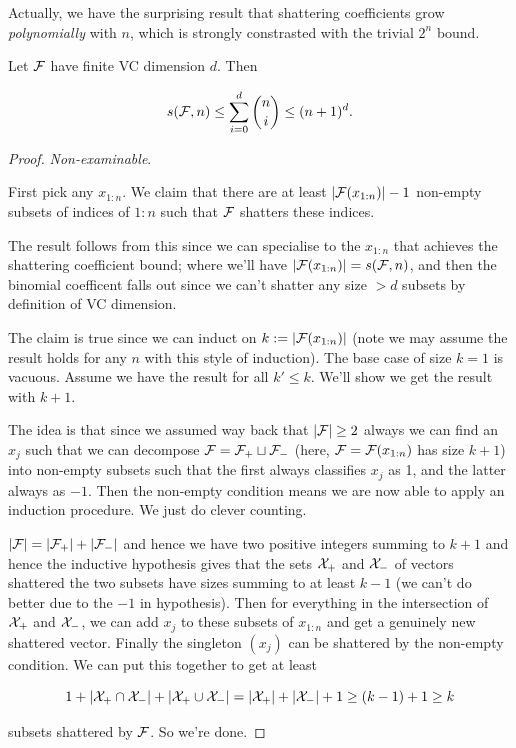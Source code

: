 \documentclass[11pt]{scrartcl}
\begin{document}
Actually, we have the surprising result that shattering coefficients grow \emph{polynomially} with $n$, which is strongly constrasted with the trivial $2^n$ bound.

\begin{theorem}

Let $\mathcal{F}$ have finite VC dimension $d$. Then

\begin{equation}
    s(\mathcal{F}, n) \le \sum_{i=0}^d \binom{n}{i} \le (n+1)^d.
\end{equation}

\begin{proof}
\emph{Non-examinable}.

First pick any $x_{1:n}$. We claim that there are at least $|\mathcal{F}(x_{1:n})| - 1$ non-empty subsets of indices of $1:n$ such that $\mathcal{F}$ shatters these indices.

The result follows from this since we can specialise to the $x_{1:n}$ that achieves the shattering coefficient bound; where we'll have $|\mathcal{F}(x_{1:n})| = s(\mathcal{F},n)$, and then the binomial coefficent falls out since we can't shatter any size $>d$ subsets by definition of VC dimension.

The claim is true since we can induct on $k := |\mathcal{F}(x_{1:n})|$ (note we may assume the result holds for any $n$ with this style of induction). The base case of size $k=1$ is vacuous. Assume we have the result for all $k'\le k$. We'll show we get the result with $k+1$.

The idea is that since we assumed way back that $|\mathcal{F}|\ge2$ always we can find an $x_j$ such that we can decompose $\mathcal{F} = \mathcal{F}_+ \sqcup \mathcal{F}_-$ (here, $\mathcal{F} = \mathcal{F}(x_{1:n})$ has size $k+1$) into non-empty subsets such that the first always classifies $x_j$ as 1, and the latter always as $-1$. Then the non-empty condition means we are now able to apply an induction procedure. We just do clever counting.

$|\mathcal{F}| = |\mathcal{F}_+| + |\mathcal{F}_-|$ and hence we have two positive integers summing to $k+1$ and hence the inductive hypothesis gives that the sets $\mathcal{X}_+$ and $\mathcal{X}_-$ of vectors shattered the two subsets have sizes summing to at least $k-1$ (we can't do better due to the $-1$ in hypothesis). Then for everything in the intersection of $\mathcal{X}_+$ and $\mathcal{X}_-$, we can add $x_j$ to these subsets of $x_{1:n}$ and get a genuinely new shattered vector. Finally the singleton $(x_j)$ can be shattered by the non-empty condition. We can put this together to get at least

\begin{equation}
    1 + |\mathcal{X}_+ \cap \mathcal{X}_-| + |\mathcal{X}_+ \cup \mathcal{X}_-| = |\mathcal{X}_+| + |\mathcal{X}_-| + 1 \ge (k-1) + 1 \ge k
\end{equation}

subsets shattered by $\mathcal{F}$. So we're done.

\end{proof}

\end{theorem}
\end{document}
